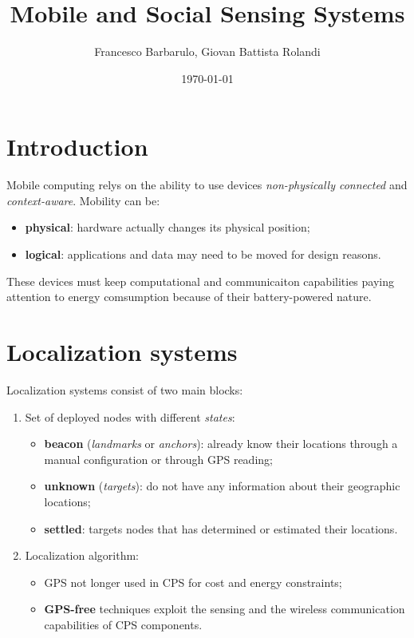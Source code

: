 \documentclass[a4paper,12pt]{article}
\title{Mobile and Social Sensing Systems}
\author{Francesco Barbarulo, Giovan Battista Rolandi}
\date{\monthyeardate\today}
\begin{document}

\maketitle
{}

\tableofcontents

\newpage


\section{Introduction}

Mobile computing relys on the ability to use devices \textit{non-physically connected} and \textit{context-aware}. Mobility can be:
\begin{itemize}
  \item \textbf{physical}: hardware actually changes its physical position;
  \item \textbf{logical}: applications and data may need to be moved for design reasons.
\end{itemize}
These devices must keep computational and communicaiton capabilities paying attention to energy comsumption because of their battery-powered nature.

\section{Localization systems}
Localization systems consist of two main blocks:
\begin{enumerate}[label=(\roman*)]
	\item Set of deployed nodes with different \textit{states}:
		\begin{itemize}
		 	\item \textbf{beacon} (\textit{landmarks} or \textit{anchors}): already know their locations through a manual configuration or through GPS reading;
		  	\item \textbf{unknown} (\textit{targets}): do not have any information about their geographic locations;
		  	\item \textbf{settled}: targets nodes that has determined or estimated their locations.
		\end{itemize}
	\item Localization algorithm:
		\begin{itemize}
			\item GPS not longer used in CPS for cost and energy constraints;
			\item \textbf{GPS-free} techniques exploit the sensing and the wireless communication capabilities of CPS components.
		\end{itemize}
\end{enumerate}
\end{document}
